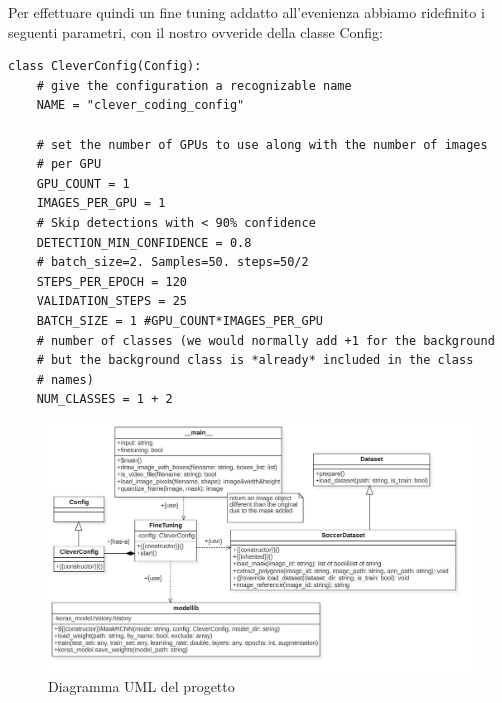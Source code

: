 Per effettuare quindi un fine tuning addatto all'evenienza abbiamo ridefinito i seguenti parametri, con il nostro ovveride della classe Config:
\begin{lstlisting}
class CleverConfig(Config):
    # give the configuration a recognizable name
    NAME = "clever_coding_config"

    # set the number of GPUs to use along with the number of images
    # per GPU
    GPU_COUNT = 1
    IMAGES_PER_GPU = 1
    # Skip detections with < 90% confidence
    DETECTION_MIN_CONFIDENCE = 0.8
    # batch_size=2. Samples=50. steps=50/2
    STEPS_PER_EPOCH = 120
    VALIDATION_STEPS = 25
    BATCH_SIZE = 1 #GPU_COUNT*IMAGES_PER_GPU
    # number of classes (we would normally add +1 for the background
    # but the background class is *already* included in the class
    # names)
    NUM_CLASSES = 1 + 2

\end{lstlisting}
\newpage
\begin{figure}
   \includegraphics[width=\linewidth]{images/UML.jpg}
    \caption{Diagramma UML del progetto}
    \label{fig:uml}
\end{figure}






